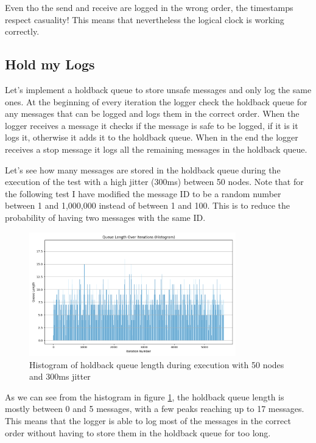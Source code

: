 \documentclass[a4paper, 11pt]{article}
\begin{document}
Even tho the send and receive are logged in the wrong order, the timestamps respect casuality! This means that nevertheless the logical clock is working correctly.

\subsection{Hold my Logs}

Let's implement a holdback queue to store unsafe messages and only log the same ones.
At the beginning of every iteration the logger check the holdback queue for any messages that can be logged and logs them in the correct order. When the logger receives a message it checks if the message is safe to be logged, if it is it logs it, otherwise it adds it to the holdback queue. When in the end the logger receives a stop message it logs all the remaining messages in the holdback queue.

Let's see how many messages are stored in the holdback queue during the execution of the test with a high jitter (300ms) between 50 nodes. Note that for the following test I have modified the message ID to be a random number between 1 and 1,000,000 instead of between 1 and 100. This is to reduce the probability of having two messages with the same ID.

\begin{figure}[H]
  \centering
  \includegraphics[width=0.8\textwidth]{imgs/test_queue_len_50_histogram.png}
  \caption{Histogram of holdback queue length during execution with 50 nodes and 300ms jitter}
  \label{fig:queue_histogram}
\end{figure}

As we can see from the histogram in figure \ref{fig:queue_histogram}, the holdback queue length is mostly between 0 and 5 messages, with a few peaks reaching up to 17 messages. This means that the logger is able to log most of the messages in the correct order without having to store them in the holdback queue for too long.
\end{document}
